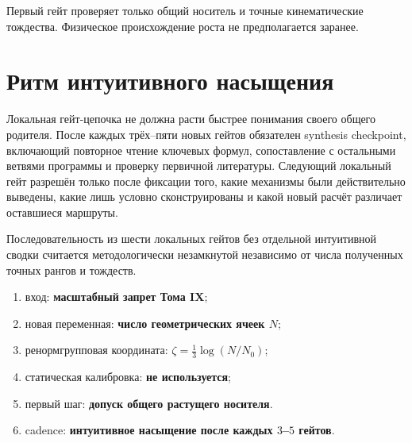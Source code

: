 Первый гейт проверяет только общий носитель и точные кинематические тождества.
Физическое происхождение роста не предполагается заранее.

\section{Ритм интуитивного насыщения}

Локальная гейт-цепочка не должна расти быстрее понимания своего общего
родителя. После каждых трёх--пяти новых гейтов обязателен synthesis
checkpoint, включающий повторное чтение ключевых формул, сопоставление с
остальными ветвями программы и проверку первичной литературы. Следующий
локальный гейт разрешён только после фиксации того, какие механизмы были
действительно выведены, какие лишь условно сконструированы и какой новый
расчёт различает оставшиеся маршруты.

\begin{nogocriterion}
Последовательность из шести локальных гейтов без отдельной интуитивной
сводки считается методологически незамкнутой независимо от числа
полученных точных рангов и тождеств.
\end{nogocriterion}

\begin{protocol}\begin{enumerate}
\item вход: \textbf{масштабный запрет Тома IX};
\item новая переменная: \textbf{число геометрических ячеек $N$};
\item ренормгрупповая координата: \textbf{$\zeta=\frac13\log(N/N_0)$};
\item статическая калибровка: \textbf{не используется};
\item первый шаг: \textbf{допуск общего растущего носителя}.
\item cadence: \textbf{интуитивное насыщение после каждых $3$--$5$ гейтов}.
\end{enumerate}\end{protocol}